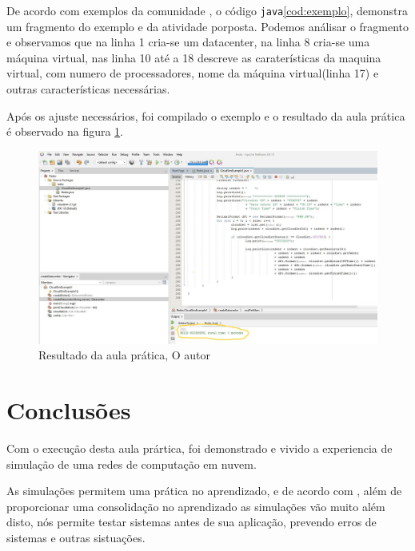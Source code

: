 \par De acordo com exemplos da comunidade , o código \verb#java#\ref{cod:exemplo}, demonstra um fragmento do exemplo e da atividade porposta. Podemos análisar o fragmento e observamos que na linha 1 cria-se um datacenter, na linha 8 cria-se uma máquina virtual, nas linha 10 até a 18 descreve as caraterísticas da maquina virtual, com numero de processadores, nome da máquina virtual(linha 17) e outras características necessárias.





\newpage
\par Após os ajuste necessários, foi compilado o exemplo e o resultado da aula prática é observado na figura \ref{fig:result_pratic}.

\begin{figure}[h]
  \center
  \includegraphics[width=\textwidth]{figure/result_pratic.jpg}
  \caption{Resultado da aula prática, O autor}
  \label{fig:result_pratic}
\end{figure}
\section{Conclusões}
\par Com o execução desta aula prártica, foi demonstrado e vivido a experiencia de simulação de uma redes de computação em nuvem.
\par As simulações permitem uma prática no aprendizado, e de acordo com , além de proporcionar uma consolidação no aprendizado as simulações vão muito além disto, nós permite testar sistemas antes de sua aplicação, prevendo erros de sistemas e outras sistuações.





